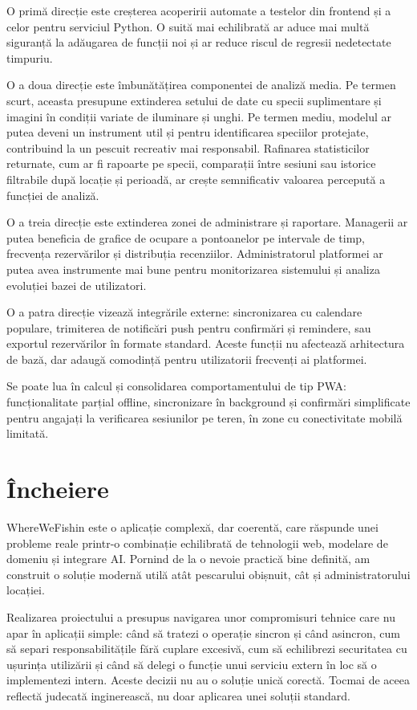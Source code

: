 O primă direcție este creșterea acoperirii automate a testelor din frontend și a celor pentru serviciul Python. O suită mai echilibrată ar aduce mai multă siguranță la adăugarea de funcții noi și ar reduce riscul de regresii nedetectate timpuriu.

O a doua direcție este îmbunătățirea componentei de analiză media. Pe termen scurt, aceasta presupune extinderea setului de date cu specii suplimentare și imagini în condiții variate de iluminare și unghi. Pe termen mediu, modelul ar putea deveni un instrument util și pentru identificarea speciilor protejate, contribuind la un pescuit recreativ mai responsabil. Rafinarea statisticilor returnate, cum ar fi rapoarte pe specii, comparații între sesiuni sau istorice filtrabile după locație și perioadă, ar crește semnificativ valoarea percepută a funcției de analiză.

O a treia direcție este extinderea zonei de administrare și raportare. Managerii ar putea beneficia de grafice de ocupare a pontoanelor pe intervale de timp, frecvența rezervărilor și distribuția recenziilor. Administratorul platformei ar putea avea instrumente mai bune pentru monitorizarea sistemului și analiza evoluției bazei de utilizatori.

O a patra direcție vizează integrările externe: sincronizarea cu calendare populare, trimiterea de notificări push pentru confirmări și remindere, sau exportul rezervărilor în formate standard. Aceste funcții nu afectează arhitectura de bază, dar adaugă comodință pentru utilizatorii frecvenți ai platformei.

Se poate lua în calcul și consolidarea comportamentului de tip PWA: funcționalitate parțial offline, sincronizare în background și confirmări simplificate pentru angajați la verificarea sesiunilor pe teren, în zone cu conectivitate mobilă limitată.

\section{Încheiere}

WhereWeFishin este o aplicație complexă, dar coerentă, care răspunde unei probleme reale printr-o combinație echilibrată de tehnologii web, modelare de domeniu și integrare AI. Pornind de la o nevoie practică bine definită, am construit o soluție modernă utilă atât pescarului obișnuit, cât și administratorului locației.

Realizarea proiectului a presupus navigarea unor compromisuri tehnice care nu apar în aplicații simple: când să tratezi o operație sincron și când asincron, cum să separi responsabilitățile fără cuplare excesivă, cum să echilibrezi securitatea cu ușurința utilizării și când să delegi o funcție unui serviciu extern în loc să o implementezi intern. Aceste decizii nu au o soluție unică corectă. Tocmai de aceea reflectă judecată inginerească, nu doar aplicarea unei soluții standard.

